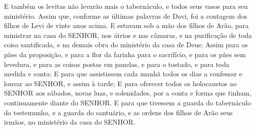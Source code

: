 {{  E também os levitas não levarão mais o tabernáculo, e todos seus vasos para seu ministério}.
  Assim que, conforme as últimas palavras de Davi, foi a contagem dos filhos de Levi de vinte anos acima.
  E estavam sob a mão dos filhos de Arão, para ministrar na casa do SENHOR, nos átrios e nas câmaras, e na purificação de toda coisa santificada, e na demais obra do ministério da casa de Deus;
  Assim para os pães da proposição, e para a flor da farinha para o sacrifício, e para os pães sem levedura, e para as coisas postas em panelas, e para o tostado, e para toda medida e conta;
  E para que assistissem cada manhã todos os dias a confessar e louvar ao SENHOR, e assim à tarde;
  E para oferecer todos os holocaustos ao SENHOR aos sábados, novas luas, e solenidades, por a conta e forma que tinham, continuamente diante do SENHOR.
  E para que tivessem a guarda do tabernáculo do testemunho, e a guarda do santuário, e as ordens dos filhos de Arão seus irmãos, no ministério da casa do SENHOR.
\par }

